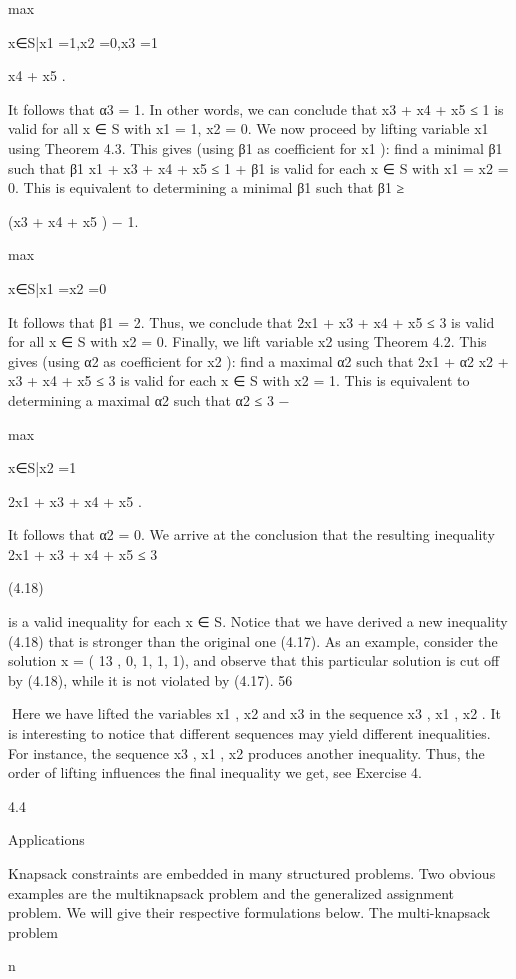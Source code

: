 \documentclass[titlepage]{book}
\theoremstyle{plain}
\theoremstyle{definition}
\theoremstyle{remark}
\begin{document}
max

x∈S|x1 =1,x2 =0,x3 =1

x4 + x5 .

It follows that α3 = 1. In other words, we can conclude that x3 + x4 + x5 ≤ 1 is valid for all x ∈ S with
x1 = 1, x2 = 0.
We now proceed by lifting variable x1 using Theorem 4.3. This gives (using β1 as coefficient for x1 ): find
a minimal β1 such that β1 x1 + x3 + x4 + x5 ≤ 1 + β1 is valid for each x ∈ S with x1 = x2 = 0. This is
equivalent to determining a minimal β1 such that
β1 ≥

(x3 + x4 + x5 ) − 1.

max

x∈S|x1 =x2 =0

It follows that β1 = 2. Thus, we conclude that 2x1 + x3 + x4 + x5 ≤ 3 is valid for all x ∈ S with x2 = 0.
Finally, we lift variable x2 using Theorem 4.2. This gives (using α2 as coefficient for x2 ): find a maximal
α2 such that 2x1 + α2 x2 + x3 + x4 + x5 ≤ 3 is valid for each x ∈ S with x2 = 1. This is equivalent to
determining a maximal α2 such that
α2 ≤ 3 −

max

x∈S|x2 =1

2x1 + x3 + x4 + x5 .

It follows that α2 = 0. We arrive at the conclusion that the resulting inequality
2x1 + x3 + x4 + x5 ≤ 3

(4.18)

is a valid inequality for each x ∈ S. Notice that we have derived a new inequality (4.18) that is stronger
than the original one (4.17). As an example, consider the solution x = ( 13 , 0, 1, 1, 1), and observe that
this particular solution is cut off by (4.18), while it is not violated by (4.17).
56

Here we have lifted the variables x1 , x2 and x3 in the sequence x3 , x1 , x2 . It is interesting to notice that
different sequences may yield different inequalities. For instance, the sequence x3 , x1 , x2 produces another
inequality. Thus, the order of lifting influences the final inequality we get, see Exercise 4.

4.4

Applications

Knapsack constraints are embedded in many structured problems. Two obvious examples are the multiknapsack problem and the generalized assignment problem. We will give their respective formulations
below.
The multi-knapsack problem

n
\end{document}
